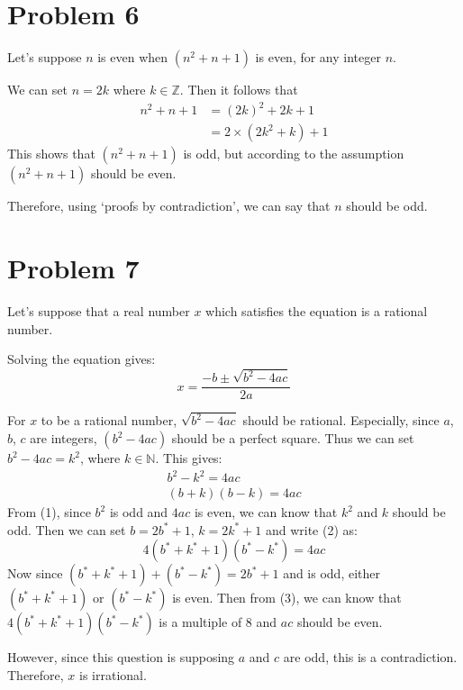 \documentclass[10pt]{article}
\begin{document}
\section*{Problem 6}
Let's suppose $n$ is even when $(n^2+n+1)$ is even, for any integer $n$. 

\vspace{0.3cm} We can set $n=2k$ where $k \in \mathbb{Z}$. Then it follows that
\begin{align*}
  n^2 + n + 1 &= (2k)^2 + 2k + 1 \\
  &= 2 \times (2k^2 + k) + 1
\end{align*}
This shows that $(n^2+n+1)$ is odd, but according to the assumption $(n^2+n+1)$ should be even.

\vspace{0.3cm} Therefore, using `proofs by contradiction', we can say that $n$ should be odd.

\section*{Problem 7} 
Let's suppose that a real number $x$ which satisfies the equation is a rational number. 

\vspace{0.3cm} Solving the equation gives:
$$x = \frac{-b \pm \sqrt{b^2-4ac}}{2a}$$

For $x$ to be a rational number, $\sqrt{b^2-4ac}$ should be rational. Especially, since $a$, $b$, $c$ are integers, $(b^2-4ac)$ should be a perfect square. Thus we can set $b^2-4ac = k^2$, where $k \in \mathbb{N}$. This gives:
\begin{gather}
  b^2 - k^2 = 4ac \\
  (b+k)(b-k) = 4ac
\end{gather}
From (1), since $b^2$ is odd and $4ac$ is even, we can know that $k^2$ and $k$ should be odd. Then we can set $b=2b^*+1$, $k=2k^*+1$ and write (2) as:
\begin{equation}
  4(b^*+k^*+1)(b^*-k^*) = 4ac
\end{equation}
Now since $(b^*+k^*+1) + (b^*-k^*) = 2b^* + 1$ and is odd, either $(b^*+k^*+1)$ or $(b^*-k^*)$ is even. Then from (3), we can know that $4(b^*+k^*+1)(b^*-k^*)$ is a multiple of 8 and $ac$ should be even.

\vspace{0.3cm}
However, since this question is supposing $a$ and $c$ are odd, this is a contradiction. Therefore, $x$ is irrational.
\end{document}
